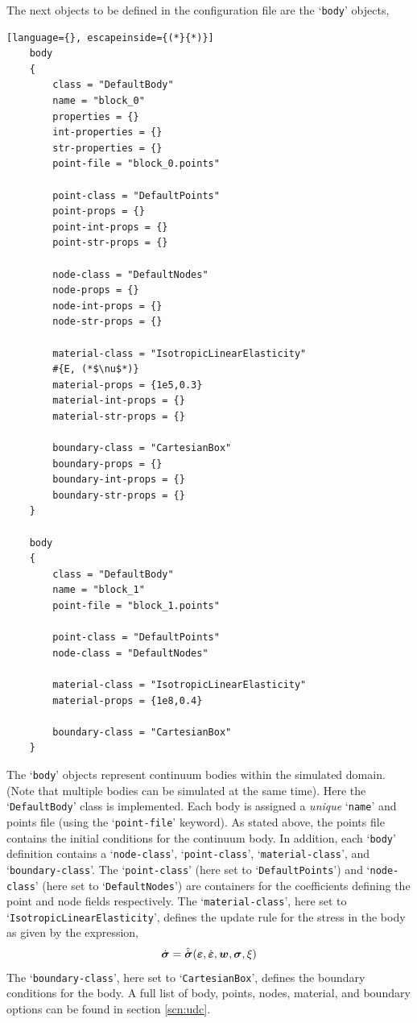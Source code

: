 The next objects to be defined in the configuration file are the `\texttt{body}' objects,
\begin{lstlisting}[language={}, escapeinside={(*}{*)}]
    body
    {
        class = "DefaultBody"
        name = "block_0"
        properties = {}
        int-properties = {}
        str-properties = {}
        point-file = "block_0.points"

        point-class = "DefaultPoints"
        point-props = {}
        point-int-props = {}
        point-str-props = {}

        node-class = "DefaultNodes"
        node-props = {}
        node-int-props = {}
        node-str-props = {}
        
        material-class = "IsotropicLinearElasticity"
        #{E, (*$\nu$*)}
        material-props = {1e5,0.3}
        material-int-props = {}
        material-str-props = {}
        
        boundary-class = "CartesianBox"
        boundary-props = {}
        boundary-int-props = {}
        boundary-str-props = {}
    }
    
    body
    {
        class = "DefaultBody"
        name = "block_1"
        point-file = "block_1.points"
        
        point-class = "DefaultPoints"
        node-class = "DefaultNodes"    

        material-class = "IsotropicLinearElasticity"
        material-props = {1e8,0.4}
        
        boundary-class = "CartesianBox"
    }
\end{lstlisting}
The `\texttt{body}' objects represent continuum bodies within the simulated domain. (Note that multiple bodies can be simulated at the same time). Here the `\texttt{DefaultBody}' class is implemented. Each body is assigned a \textit{unique} `\texttt{name}' and points file (using the `\texttt{point-file}' keyword). As stated above, the points file contains the initial conditions for the continuum body. In addition, each `\texttt{body}' definition contains a `\texttt{node-class}', `\texttt{point-class}', `\texttt{material-class}', and `\texttt{boundary-class}'. The `\texttt{point-class}' (here set to `\texttt{DefaultPoints}') and `\texttt{node-class}' (here set to `\texttt{DefaultNodes}') are containers for the coefficients defining the point and node fields respectively. The `\texttt{material-class}', here set to `\texttt{IsotropicLinearElasticity}', defines the update rule for the stress in the body as given by the expression,
\begin{equation} \label{eq:stress_pde}
\dot{\boldsymbol{\sigma}} = \hat{\dot{\boldsymbol{\sigma}}}(\boldsymbol{\varepsilon},\dot{\boldsymbol{\varepsilon}},\boldsymbol{w},\boldsymbol{\sigma},\xi)
\end{equation}
The `\texttt{boundary-class}', here set to `\texttt{CartesianBox}', defines the boundary conditions for the body. A full list of body, points, nodes, material, and boundary options can be found in section \ref{scn:udc}.

